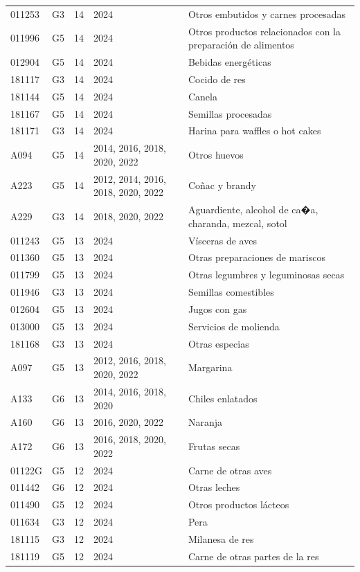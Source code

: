 \begin{table}[ht]
\begin{tabular}{llrll}
  011253 & G3 &  14 & 2024 & Otros embutidos y carnes procesadas \\ 
  011996 & G5 &  14 & 2024 & Otros productos relacionados con la preparación de alimentos \\ 
  012904 & G5 &  14 & 2024 & Bebidas energéticas \\ 
  181117 & G3 &  14 & 2024 & Cocido de res \\ 
  181144 & G5 &  14 & 2024 & Canela \\ 
  181167 & G5 &  14 & 2024 & Semillas procesadas \\ 
  181171 & G3 &  14 & 2024 & Harina para waffles o hot cakes \\ 
  A094 & G5 &  14 & 2014, 2016, 2018, 2020, 2022 & Otros huevos \\ 
  A223 & G5 &  14 & 2012, 2014, 2016, 2018, 2020, 2022 & Coñac y brandy \\ 
  A229 & G3 &  14 & 2018, 2020, 2022 & Aguardiente, alcohol de ca�a, charanda, mezcal, sotol \\ 
  011243 & G5 &  13 & 2024 & Vísceras de aves \\ 
  011360 & G5 &  13 & 2024 & Otras preparaciones de mariscos \\ 
  011799 & G5 &  13 & 2024 & Otras legumbres y leguminosas secas \\ 
  011946 & G3 &  13 & 2024 & Semillas comestibles \\ 
  012604 & G5 &  13 & 2024 & Jugos con gas \\ 
  013000 & G5 &  13 & 2024 & Servicios de molienda \\ 
  181168 & G3 &  13 & 2024 & Otras especias \\ 
  A097 & G5 &  13 & 2012, 2016, 2018, 2020, 2022 & Margarina \\ 
  A133 & G6 &  13 & 2014, 2016, 2018, 2020 & Chiles enlatados \\ 
  A160 & G6 &  13 & 2016, 2020, 2022 & Naranja \\ 
  A172 & G6 &  13 & 2016, 2018, 2020, 2022 & Frutas secas \\ 
  01122G & G5 &  12 & 2024 & Carne de otras aves \\ 
  011442 & G6 &  12 & 2024 & Otras leches \\ 
  011490 & G5 &  12 & 2024 & Otros productos lácteos \\ 
  011634 & G3 &  12 & 2024 & Pera \\ 
  181115 & G3 &  12 & 2024 & Milanesa de res \\ 
  181119 & G5 &  12 & 2024 & Carne de otras partes de la res \\ 

\end{tabular}
\end{table}
